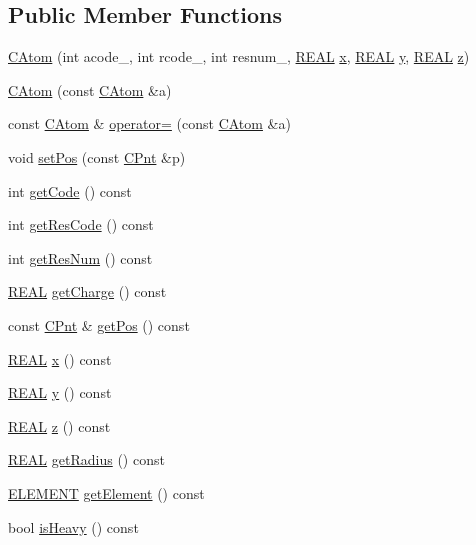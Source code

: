 \subsection*{Public Member Functions}
\begin{DoxyCompactItemize}
\item 
\hyperlink{classCAtom_a72956a614691046daa3f9cb679337c85}{C\-Atom} (int acode\-\_\-, int rcode\-\_\-, int resnum\-\_\-, \hyperlink{util_8h_a5821460e95a0800cf9f24c38915cbbde}{R\-E\-A\-L} \hyperlink{classCAtom_a4c911762af7a8abf5fec08d3a896e5df}{x}, \hyperlink{util_8h_a5821460e95a0800cf9f24c38915cbbde}{R\-E\-A\-L} \hyperlink{classCAtom_a63db481ebb7d5b7d96014d70e020acc2}{y}, \hyperlink{util_8h_a5821460e95a0800cf9f24c38915cbbde}{R\-E\-A\-L} \hyperlink{classCAtom_ae5ce32de61ffe6f35f7790de5c805bd4}{z})
\item 
\hyperlink{classCAtom_a55b4b673562699ae2fa4e3386b8d8a9b}{C\-Atom} (const \hyperlink{classCAtom}{C\-Atom} \&a)
\item 
const \hyperlink{classCAtom}{C\-Atom} \& \hyperlink{classCAtom_a52de68ec7c9d0b50599bcb24c05fbc41}{operator=} (const \hyperlink{classCAtom}{C\-Atom} \&a)
\item 
void \hyperlink{classCAtom_a214045c9b46083ef550c214d3f1a33bd}{set\-Pos} (const \hyperlink{classCPnt}{C\-Pnt} \&p)
\item 
int \hyperlink{classCAtom_a2eaa281b7aa53c83c13a66de07c9e70c}{get\-Code} () const 
\item 
int \hyperlink{classCAtom_a02f2c6f689a978639b239f0b17ccdf1e}{get\-Res\-Code} () const 
\item 
int \hyperlink{classCAtom_a6af9e202834bac9613129184d62e1c19}{get\-Res\-Num} () const 
\item 
\hyperlink{util_8h_a5821460e95a0800cf9f24c38915cbbde}{R\-E\-A\-L} \hyperlink{classCAtom_a909e61ce36305e5e923fd75d48ab6cb8}{get\-Charge} () const 
\item 
const \hyperlink{classCPnt}{C\-Pnt} \& \hyperlink{classCAtom_ad53ff83c6676d072a06694a4398b257d}{get\-Pos} () const 
\item 
\hyperlink{util_8h_a5821460e95a0800cf9f24c38915cbbde}{R\-E\-A\-L} \hyperlink{classCAtom_a4c911762af7a8abf5fec08d3a896e5df}{x} () const 
\item 
\hyperlink{util_8h_a5821460e95a0800cf9f24c38915cbbde}{R\-E\-A\-L} \hyperlink{classCAtom_a63db481ebb7d5b7d96014d70e020acc2}{y} () const 
\item 
\hyperlink{util_8h_a5821460e95a0800cf9f24c38915cbbde}{R\-E\-A\-L} \hyperlink{classCAtom_ae5ce32de61ffe6f35f7790de5c805bd4}{z} () const 
\item 
\hyperlink{util_8h_a5821460e95a0800cf9f24c38915cbbde}{R\-E\-A\-L} \hyperlink{classCAtom_a07a673af1c8461ed3543b352dc1db7d9}{get\-Radius} () const 
\item 
\hyperlink{classCAtom_a79e729b143961179c43939392d704848}{E\-L\-E\-M\-E\-N\-T} \hyperlink{classCAtom_ae7a0eafdaea94df055fd5fe86bce0404}{get\-Element} () const 
\item 
bool \hyperlink{classCAtom_ac23e0bb6890eac49c8da3f350c1190b3}{is\-Heavy} () const 
\end{DoxyCompactItemize}
